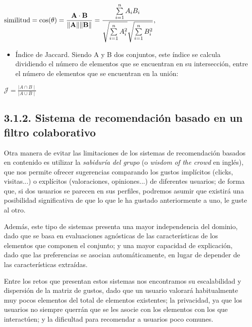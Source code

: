 ${\displaystyle {\text{similitud}}=\cos(\theta )={\mathbf {A} \cdot \mathbf {B} \over \|\mathbf {A} \|\|\mathbf {B} \|}={\frac {\sum \limits _{i=1}^{n}{A_{i}B_{i}}}{{\sqrt {\sum \limits _{i=1}^{n}{A_{i}^{2}}}}{\sqrt {\sum \limits _{i=1}^{n}{B_{i}^{2}}}}}},}$

\begin{itemize}
    \item Índice de Jaccard. Siendo A y B dos conjuntos, este índice se calcula dividiendo el número de elementos que se encuentran en su intersección, entre el número de elementos que se encuentran en la unión:
\end{itemize}

${\displaystyle {\mathcal {J}}={\frac {\mid A\cap B\mid }{\mid A\cup B\mid }}}$

\subsection{3.1.2. Sistema de recomendación basado en un filtro colaborativo}

Otra manera de evitar las limitaciones de los sistemas de recomendación basados en contenido es utilizar la \textit{sabiduría del grupo} (o \textit{wisdom of the crowd} en inglés), que nos permite ofrecer sugerencias comparando los gustos implícitos (clicks, visitas...) o explícitos (valoraciones, opiniones...) de diferentes usuarios; de forma que, si dos usuarios se parecen en sus perfiles, podremos asumir que existirá una posibilidad significativa de que lo que le ha gustado anteriormente a uno, le guste al otro.

Además, este tipo de sistemas presenta una mayor independencia del dominio, dado que se basa en evaluaciones agnósticas de las características de los elementos que componen el conjunto; y una mayor capacidad de explicación, dado que las preferencias se asocian automáticamente, en lugar de depender de las características extraídas.

Entre los retos que presentan estos sistemas nos encontramos su escalabilidad y dispersión de la matriz de gustos, dado que un usuario valorará habitualmente muy pocos elementos del total de elementos existentes; la privacidad, ya que los usuarios no siempre querrán que se les asocie con los elementos con los que interactúen; y la dificultad para recomendar a usuarios poco comunes.

